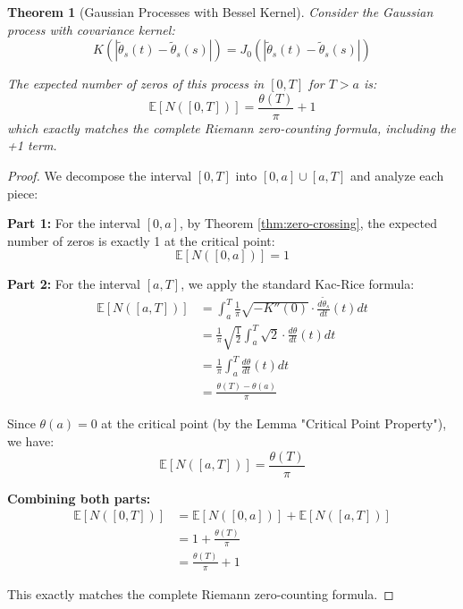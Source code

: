\documentclass{article}
\newtheorem{theorem}{Theorem}
\theoremstyle{definition}
\begin{document}
\begin{theorem}[Gaussian Processes with Bessel Kernel]
Consider the Gaussian process with covariance kernel:
\begin{equation}
K(|\tilde{\theta}_s(t) - \tilde{\theta}_s(s)|) = J_0(|\tilde{\theta}_s(t) - \tilde{\theta}_s(s)|)
\end{equation}

The expected number of zeros of this process in $[0,T]$ for $T > a$ is:
\begin{equation}
\mathbb{E}[N([0,T])] = \frac{\theta(T)}{\pi} + 1
\end{equation}
which exactly matches the complete Riemann zero-counting formula, including the +1 term.
\end{theorem}

\begin{proof}
We decompose the interval $[0,T]$ into $[0,a] \cup [a,T]$ and analyze each piece:

\textbf{Part 1:} For the interval $[0,a]$, by Theorem \ref{thm:zero-crossing}, the expected number of zeros is exactly 1 at the critical point:
\begin{equation}
\mathbb{E}[N([0,a])] = 1
\end{equation}

\textbf{Part 2:} For the interval $[a,T]$, we apply the standard Kac-Rice formula:
\begin{align}
\mathbb{E}[N([a,T])] &= \int_a^T \frac{1}{\pi}\sqrt{-K''(0)} \cdot \frac{d\tilde{\theta}_s}{dt}(t) dt \\
&= \frac{1}{\pi}\sqrt{\frac{1}{2}} \int_a^T \sqrt{2} \cdot \frac{d\theta}{dt}(t) dt \\
&= \frac{1}{\pi} \int_a^T \frac{d\theta}{dt}(t) dt \\
&= \frac{\theta(T) - \theta(a)}{\pi}
\end{align}

Since $\theta(a) = 0$ at the critical point (by the Lemma "Critical Point Property"), we have:
\begin{equation}
\mathbb{E}[N([a,T])] = \frac{\theta(T)}{\pi}
\end{equation}

\textbf{Combining both parts:}
\begin{align}
\mathbb{E}[N([0,T])] &= \mathbb{E}[N([0,a])] + \mathbb{E}[N([a,T])] \\
&= 1 + \frac{\theta(T)}{\pi} \\
&= \frac{\theta(T)}{\pi} + 1
\end{align}

This exactly matches the complete Riemann zero-counting formula.
\end{proof}
\end{document}
